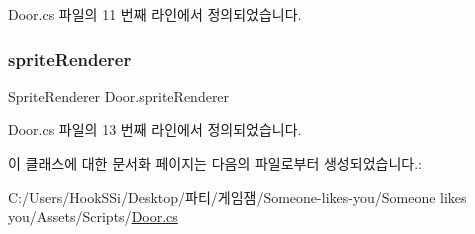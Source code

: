 Door.\+cs 파일의 11 번째 라인에서 정의되었습니다.

\mbox{\label{class_door_a0e15249011da5cb777aa49235edba8db}} 
\subsubsection{\texorpdfstring{spriteRenderer}{spriteRenderer}}
{\footnotesize\ttfamily Sprite\+Renderer Door.\+sprite\+Renderer\hspace{0.3cm}{\ttfamily [private]}}



Door.\+cs 파일의 13 번째 라인에서 정의되었습니다.



이 클래스에 대한 문서화 페이지는 다음의 파일로부터 생성되었습니다.\+:\begin{DoxyCompactItemize}
\item 
C\+:/\+Users/\+Hook\+S\+Si/\+Desktop/파티/게임잼/\+Someone-\/likes-\/you/\+Someone likes you/\+Assets/\+Scripts/\mbox{\hyperlink{_door_8cs}{Door.\+cs}}\end{DoxyCompactItemize}

